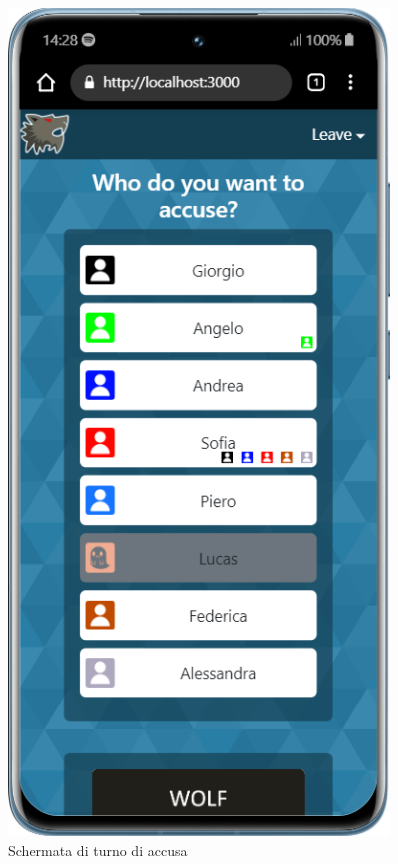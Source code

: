 \begin{figure}[H]
\begin{minipage}{0.45\textwidth}
    \end{minipage}\hfill
    \begin{minipage}{0.45\textwidth}
        \centering
        \includegraphics[width=0.9\textwidth]{img/screen/mobile/accusation_mobile.png}
        \caption{Schermata di turno di accusa}
        \label{fig:accusation_mobile}
    \end{minipage}
\end{figure}

